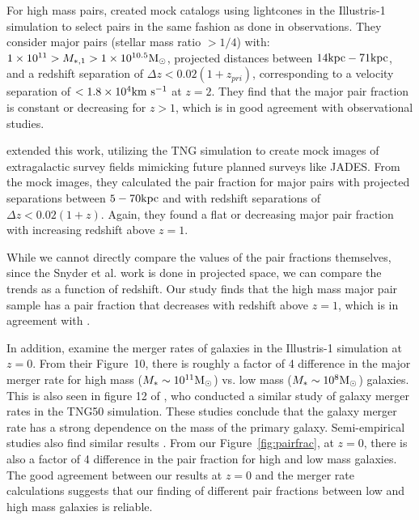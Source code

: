 \documentclass[twocolumn]{aastex631}
\begin{document}
        For high mass pairs, \citet{Snyder2017} created mock catalogs using lightcones in the Illustris-1 simulation to select pairs in the same fashion as done in observations. 
        They consider major pairs (stellar mass ratio $>1/4$) with: $1\times 10^{11}>M_{*,1} >1\times 10^{10.5}\mathrm{M}_\odot$, projected distances between $14\mathrm{kpc}-71\mathrm{kpc}$, and a redshift separation of $\Delta z<0.02(1+z_{pri})$, corresponding to a velocity separation of $<1.8\times10^4\mathrm{km}~\mathrm{s}^{-1}$ at $z=2$. 
        They find that the major pair fraction is constant or decreasing for $z>1$, which is in good agreement with observational studies.
        
        \citet{Snyder2023} extended this work, utilizing the TNG simulation to create mock images of extragalactic survey fields mimicking future planned surveys like JADES.
        From the mock images, they calculated the pair fraction for major pairs with projected separations between $5-70 \mathrm{kpc}$ and with redshift separations of $\Delta z< 0.02(1+z)$. 
        Again, they found a flat or decreasing major pair fraction with increasing redshift above $z=1$. 
        
        While we cannot directly compare the values of the pair fractions themselves, since the Snyder et al. work is done in projected space, we can compare the trends as a function of redshift. 
        Our study finds that the high mass major pair sample has a pair fraction that decreases with redshift above $z=1$, which is in agreement with \cite{Snyder2023}.

        In addition, \cite{RG2015} examine the merger rates of galaxies in the Illustris-1 simulation at $z=0$. 
        From their Figure~10, there is roughly a factor of 4 difference in the major merger rate for high mass ($M_* \sim 10^{11} \mathrm{M}_\odot$) vs. low mass ($M_* \sim 10^8 \mathrm{M}_\odot$) galaxies. 
        This is also seen in figure 12 of \cite{Guzman-Ortega2023}, who conducted a similar study of galaxy merger rates in the TNG50 simulation. 
        These studies conclude that the galaxy merger rate has a strong dependence on the mass of the primary galaxy. 
        Semi-empirical studies also find similar results \citep{Stewart2009, Hopkins2010}. 
        From our Figure~\ref{fig:pairfrac}, at $z=0$, there is also a factor of 4 difference in the pair fraction for high and low mass galaxies. 
        The good agreement between our results at $z=0$ and the merger rate calculations suggests that our finding of different pair fractions between low and high mass galaxies is reliable.  
  
\end{document}
